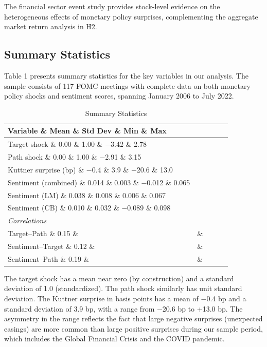 \documentclass[12pt]{article}
\begin{document}
The financial sector event study provides stock-level evidence on the heterogeneous effects of monetary policy surprises, complementing the aggregate market return analysis in H2.

\subsection{Summary Statistics}

Table 1 presents summary statistics for the key variables in our analysis. The sample consists of 117 FOMC meetings with complete data on both monetary policy shocks and sentiment scores, spanning January 2006 to July 2022.


\begin{table}[htbp]\centering\caption{Summary Statistics}\label{tab:summary}
\begin{tabular}{lcccc}\toprule
Variable \& Mean \& Std Dev \& Min \& Max \\\midrule
Target shock \& 0.00 \& 1.00 \& $-$3.42 \& 2.78 \\
Path shock \& 0.00 \& 1.00 \& $-$2.91 \& 3.15 \\
Kuttner surprise (bp) \& $-$0.4 \& 3.9 \& $-$20.6 \& 13.0 \\
Sentiment (combined) \& 0.014 \& 0.003 \& $-$0.012 \& 0.065 \\
Sentiment (LM) \& 0.038 \& 0.008 \& 0.006 \& 0.067 \\
Sentiment (CB) \& 0.010 \& 0.032 \& $-$0.089 \& 0.098 \\\midrule
\multicolumn{5}{l}{\textit{Correlations}} \\
Target--Path \& 0.15 \& & \& \\
Sentiment--Target \& 0.12 \& & \& \\
Sentiment--Path \& 0.19 \& & \& \\\bottomrule\end{tabular}
\par\vspace{2pt}{\footnotesize Sample: 117 FOMC meetings, January 2006 to July 2022. Target and path shocks are standardized to unit variance.}\end{table}


The target shock has a mean near zero (by construction) and a standard deviation of 1.0 (standardized). The path shock similarly has unit standard deviation. The Kuttner surprise in basis points has a mean of $-$0.4 bp and a standard deviation of 3.9 bp, with a range from $-$20.6 bp to +13.0 bp. The asymmetry in the range reflects the fact that large negative surprises (unexpected easings) are more common than large positive surprises during our sample period, which includes the Global Financial Crisis and the COVID pandemic.
\end{document}
